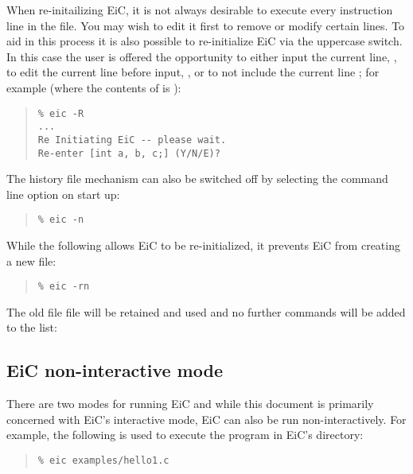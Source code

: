 When re-initailizing EiC, it is not always desirable to execute every
instruction line in the  file. You may wish to edit it
first to remove or modify certain lines. To aid in this process it is
also possible to re-initialize EiC via the uppercase
 switch. In this case the user is
offered the opportunity to either input the current line, , to
edit the current line before input, , or to not include the
current line ; for example (where the contents of 
is ):

\begin{quote}
\begin{verbatim}
% eic -R
...
Re Initiating EiC -- please wait.
Re-enter [int a, b, c;] (Y/N/E)?     
\end{verbatim}
\end{quote}


The history file mechanism can also be switched off by selecting
the  command line option on start up:
\begin{quote}
\begin{verbatim}
% eic -n
\end{verbatim}
\end{quote}

While the following allows EiC to be re-initialized, it prevents
EiC from creating a new  file: 

\begin{quote}
\begin{verbatim}
% eic -rn
\end{verbatim}
\end{quote}

The old file  file will be retained and used and no further
commands will be added to the list:



\subsection{EiC non-interactive mode}
\label{sec:NonInteractive}

There are two modes for running EiC and while this document is
primarily concerned with EiC's interactive mode, EiC can also be run
non-interactively. For example, the following is used to execute the program
 in EiC's  directory:

\begin{quote} 
\begin{verbatim}
% eic examples/hello1.c
\end{verbatim}
\end{quote}

